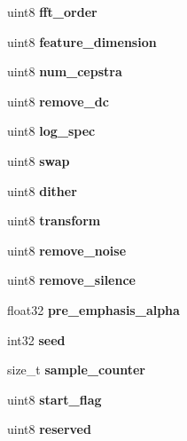 \begin{DoxyCompactItemize}
\item 
uint8 {\bfseries fft\-\_\-order}\label{structfe__s_a3783552280c06207510cbe576a76d1d9}

\item 
uint8 {\bfseries feature\-\_\-dimension}\label{structfe__s_a9c876fb2d9be5f3acaad06ddebcdc4fe}

\item 
uint8 {\bfseries num\-\_\-cepstra}\label{structfe__s_a05579b3906420cddd62fdf1ded7b63ce}

\item 
uint8 {\bfseries remove\-\_\-dc}\label{structfe__s_ac575bed8a61105f4302bd27246d4c33d}

\item 
uint8 {\bfseries log\-\_\-spec}\label{structfe__s_a7d3d6513ae6b60632d14c1e1d5dfe891}

\item 
uint8 {\bfseries swap}\label{structfe__s_ab08200d2bfc6d868536d802501525179}

\item 
uint8 {\bfseries dither}\label{structfe__s_abd7b32a70dc6512134e39dd54d160689}

\item 
uint8 {\bfseries transform}\label{structfe__s_a49f2e495d938acaf5c918059e99854e2}

\item 
uint8 {\bfseries remove\-\_\-noise}\label{structfe__s_a254fc94d7868163fba6f2d8826d60fa6}

\item 
uint8 {\bfseries remove\-\_\-silence}\label{structfe__s_a8479b916c411d6d0140bf4a16eb83437}

\item 
float32 {\bfseries pre\-\_\-emphasis\-\_\-alpha}\label{structfe__s_aa7dc496e33955b7f06f83715c05ded8e}

\item 
int32 {\bfseries seed}\label{structfe__s_a0f42573b9f0ce0247181c5dd79e16b67}

\item 
size\-\_\-t {\bfseries sample\-\_\-counter}\label{structfe__s_a40c006f7494fdad56833d5fd7ccf6904}

\item 
uint8 {\bfseries start\-\_\-flag}\label{structfe__s_aa05ae3633c2b33e77a7b8b90e769176b}

\item 
uint8 {\bfseries reserved}\label{structfe__s_a18670c79bc0cd9848fdf4711c5094542}


\end{DoxyCompactItemize}
